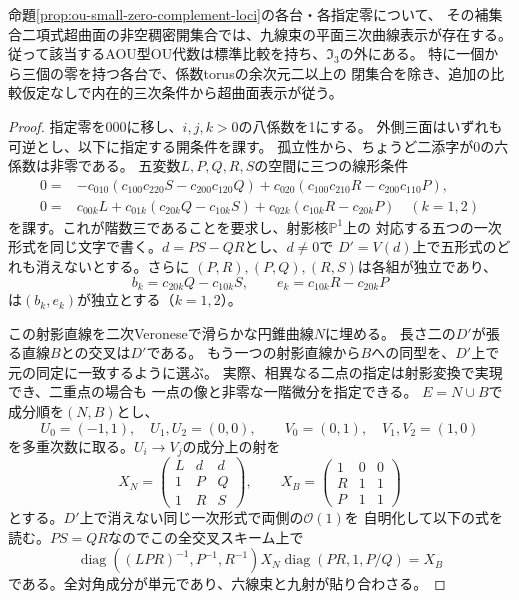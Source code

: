 \begin{theorem}
\label{thm:ou-complement-line-conic}
命題\ref{prop:ou-small-zero-complement-loci}の各台・各指定零について、
その補集合二項式超曲面の非空稠密開集合では、九線束の平面三次曲線表示が存在する。
従って該当するAOU型OU代数は標準比較を持ち、$\mathfrak I_3$の外にある。
特に一個から三個の零を持つ各台で、係数torusの余次元二以上の
閉集合を除き、追加の比較仮定なしで内在的三次条件から超曲面表示が従う。
\end{theorem}
\begin{proof}
指定零を$000$に移し、$i,j,k>0$の八係数を1にする。
外側三面はいずれも可逆とし、以下に指定する開条件を課す。
孤立性から、ちょうど二添字が0の六係数は非零である。
五変数$L,P,Q,R,S$の空間に三つの線形条件
\begin{align*}
0={}&-c_{010}(c_{100}c_{220}S-c_{200}c_{120}Q)
       +c_{020}(c_{100}c_{210}R-c_{200}c_{110}P),\\
0={}&c_{00k}L+c_{01k}(c_{20k}Q-c_{10k}S)+c_{02k}(c_{10k}R-c_{20k}P)
\quad(k=1,2)
\end{align*}
を課す。これが階数三であることを要求し、射影核$\mathbb P^1$上の
対応する五つの一次形式を同じ文字で書く。$d=PS-QR$とし、$d\ne0$で
$D'=V(d)$上で五形式のどれも消えないとする。さらに
$(P,R),(P,Q),(R,S)$は各組が独立であり、
\[
 b_k=c_{20k}Q-c_{10k}S,\qquad e_k=c_{10k}R-c_{20k}P
\]
は$(b_k,e_k)$が独立とする（$k=1,2$）。

この射影直線を二次Veroneseで滑らかな円錐曲線$N$に埋める。
長さ二の$D'$が張る直線$B$との交叉は$D'$である。
もう一つの射影直線から$B$への同型を、$D'$上で元の同定に一致するように選ぶ。
実際、相異なる二点の指定は射影変換で実現でき、二重点の場合も
一点の像と非零な一階微分を指定できる。
$E=N\cup B$で成分順を$(N,B)$とし、
\[
 U_0=(-1,1),\quad U_1,U_2=(0,0),\qquad
 V_0=(0,1),\quad V_1,V_2=(1,0)
\]
を多重次数に取る。$U_i\to V_j$の成分上の射を
\[
 X_N=\begin{pmatrix}L&d&d\\1&P&Q\\1&R&S\end{pmatrix},\qquad
 X_B=\begin{pmatrix}1&0&0\\R&1&1\\P&1&1\end{pmatrix}
\]
とする。$D'$上で消えない同じ一次形式で両側の$\mathcal O(1)$を
自明化して以下の式を読む。$PS=QR$なのでこの全交叉スキーム上で
\[
 \operatorname{diag}((LPR)^{-1},P^{-1},R^{-1})
 X_N\operatorname{diag}(PR,1,P/Q)=X_B
\]
である。全対角成分が単元であり、六線束と九射が貼り合わさる。


\end{proof}
